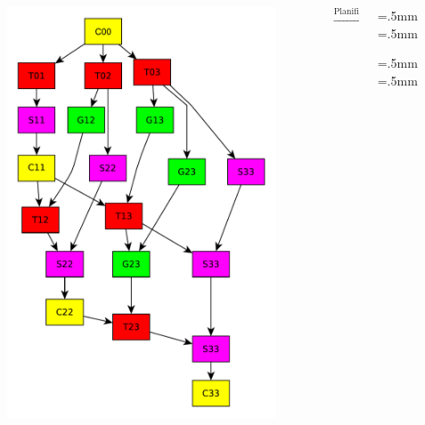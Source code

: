 \documentclass[10pt]{beamer}
\begin{document}
\begin{frame}[fragile]
\begin{columns}[c]
\begin{column}{0.20\textwidth}
\begin{figure}[tbh!]
\begin{center}
          \includegraphics[scale=0.15]{Figures/4x4_TaskExample}
        \end{center}
      \end{figure}
    \end{column}
    \begin{column}{0.1\textwidth}
      $\xrightarrow{\text{Planificación}}$
    \end{column}
    \begin{column}{0.25\textwidth}
      \centering
      \fboxsep=2mm \fboxrule=.5mm
      \fboxsep=1.5mm \fboxrule=.5mm

      \fboxsep=2mm \fboxrule=.5mm
      \fboxsep=1.5mm \fboxrule=.5mm


\end{column}
\end{columns}
\end{frame}
\end{document}
